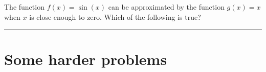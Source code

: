 \documentclass{ximera}
\begin{document}
\begin{shuffle}
\begin{problem}
 The function $f(x)=\sin(x)$ can be approximated by the function $g(x)=x$ when $x$ is close enough to zero.  Which of the following is true?
\begin{multipleChoice}
\end{multipleChoice}
\end{problem}

\end{shuffle} 

\hrule

\section{Some harder problems}
\end{document}
